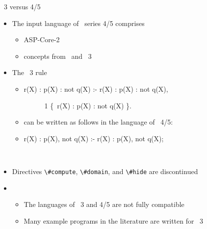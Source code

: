 \begin{frame}{\gringo~3 versus 4/5}
\begin{itemize}
\item The input language of \gringo\ series 4/5 comprises
  \begin{itemize}
  \item ASP-Core-2
  \item concepts from \lparse\ and \gringo\ 3
  \end{itemize}
\item<2-> 
  The \gringo\ 3 rule
  \begin{itemize}
  \item
\begin{semiverbatim}
  r(X) : p(X) : not q(X) :- r(X) : p(X) : not q(X),

  \ \ \ \ \ \ 1 \{\ r(X) : p(X) : not q(X) \}.
\end{semiverbatim}

  \item<3->[] can be written as follows in the language of \gringo\ 4/5:
    \smallskip
  \item<3->
\begin{semiverbatim}
  r(X) : p(X), not q(X) :- r(X) : p(X), not q(X);

  \ \ \ \ \ \ 
\end{semiverbatim}
  \end{itemize}
\item<5->  Directives {\small\lstinline{\#compute}}, {\small\lstinline{\#domain}}, and {\small\lstinline{\#hide}} are discontinued
\item<6-> 
  \begin{itemize}
  \item The languages of \gringo\ 3 and 4/5 are not fully compatible
  \item Many example programs in the literature are written for \gringo\ 3
  \end{itemize}
\end{itemize}
\end{frame}